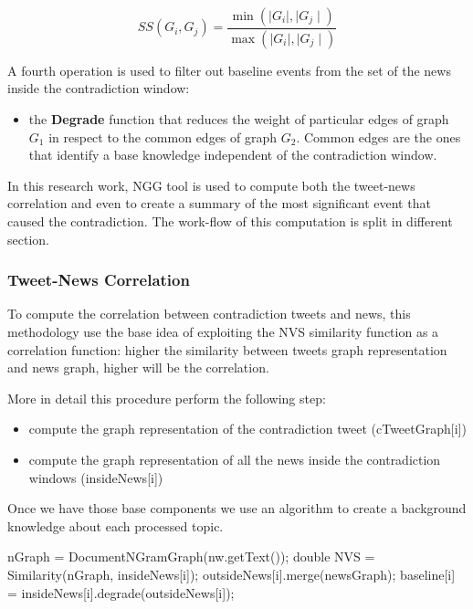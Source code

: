 \begin{equation}
 SS(G_i,G_j)=\frac{\min(\mid G_i \mid, \mid G_j \mid)}{\max(\mid G_i \mid, \mid G_j \mid)}
\end{equation}

A fourth operation is used to filter out baseline events from the set of the news inside the contradiction window:
\begin{itemize}
 	\item the \textbf{Degrade} function that reduces the weight of particular edges of graph $G_1$ in respect to the common edges of graph $G_2$. Common edges are the ones that identify a base knowledge independent of the contradiction window.
\end{itemize}

In this research work, NGG tool is used to compute both the tweet-news correlation and even to create a summary of the most significant event that caused the contradiction. 
The work-flow of this computation is split in different section.

\subsubsection*{Tweet-News Correlation}
To compute the correlation between contradiction tweets and news, this methodology use the base idea of exploiting the NVS similarity function as a correlation function: higher the similarity between tweets graph representation and news graph, higher will be the correlation.

More in detail this procedure perform the following step:
\begin{itemize}
	\item compute the graph representation of the contradiction tweet (cTweetGraph[i])
	\item compute the  graph representation of all the news inside the contradiction windows (insideNews[i])
\end{itemize}

Once we have those base components we use an algorithm to create a background knowledge about each processed topic.

\begin{algorithmic}
		\STATE nGraph = DocumentNGramGraph(nw.getText());
		\STATE double NVS = Similarity(nGraph, insideNews[i]);
			\STATE outsideNews[i].merge(newsGraph);
		\ENDIF
	\ENDIF
\ENDFOR
\STATE baseline[i] = insideNews[i].degrade(outsideNews[i]);
\end{algorithmic}

